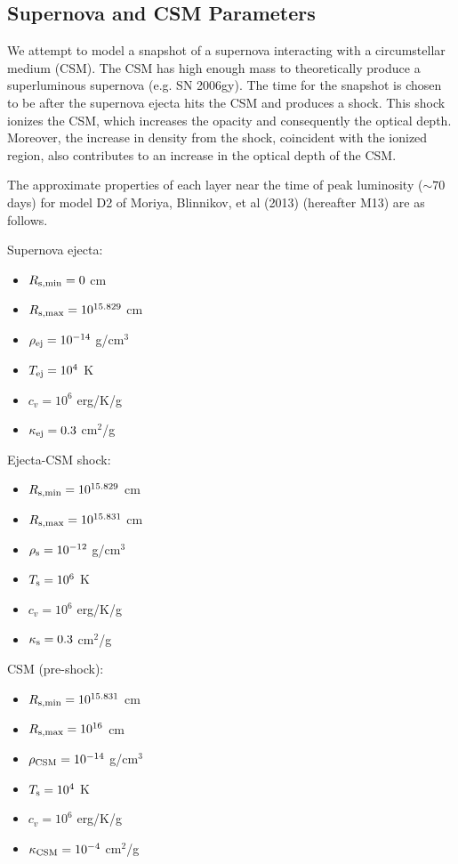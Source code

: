 \documentclass[]{article}
\begin{document}
	\subsection{Supernova and CSM Parameters} \label{sec:sncsmpars}
		We attempt to model a snapshot of a supernova interacting with a circumstellar medium (CSM). The CSM has high enough mass to theoretically produce a superluminous supernova (e.g. SN 2006gy). The time for the snapshot is chosen to be after the supernova ejecta hits the CSM and produces a shock. This shock ionizes the CSM, which increases the opacity and consequently the optical depth. Moreover, the increase in density from the shock, coincident with the ionized region, also contributes to an increase in the optical depth of the CSM.
		
		The approximate properties of each layer near the time of peak luminosity ($\sim70$ days) for model D2 of Moriya, Blinnikov, et al (2013) (hereafter M13) are as follows.
		
		Supernova ejecta:
		\begin{itemize}
			\item $R_{\rm s, min} = 0$ cm
			\item $R_{\rm s, max} = 10^{15.829}$ cm
			\item $\rho_{\rm ej} = 10^{-14}$ g/cm$^3$
			\item $T_{\rm ej} = 10^4$ K
			\item $c_v = 10^6$ erg/K/g
			\item $\kappa_{\rm ej} = 0.3$ cm$^2$/g
		\end{itemize}
		
		Ejecta-CSM shock:
		\begin{itemize}
			\item $R_{\rm s, min} = 10^{15.829}$ cm
			\item $R_{\rm s, max} = 10^{15.831}$ cm
			\item $\rho_{\rm s} = 10^{-12}$ g/cm$^3$
			\item $T_{\rm s} = 10^6$ K
			\item $c_v = 10^6$ erg/K/g
			\item $\kappa_{\rm s} = 0.3$ cm$^2$/g
		\end{itemize}
		
		CSM (pre-shock):
		\begin{itemize}
			\item $R_{\rm s, min} = 10^{15.831}$ cm
			\item $R_{\rm s, max} = 10^{16}$ cm
			\item $\rho_{\rm CSM} = 10^{-14}$ g/cm$^3$
			\item $T_{\rm s} = 10^4$ K
			\item $c_v = 10^6$ erg/K/g
			\item $\kappa_{\rm CSM} = 10^{-4}$ cm$^2$/g
		\end{itemize}
		
\end{document}
